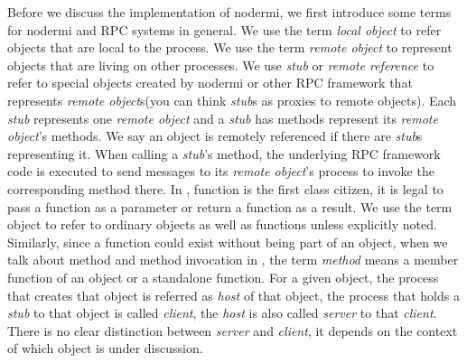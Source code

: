 Before we discuss the implementation of nodermi,
we first introduce some terms for nodermi and 
RPC systems in general.
We use the term \emph{local object}
to refer objects that are local to the process.
We use the term \emph{remote object} to represent objects that are
living on other processes.
We use \emph{stub} or \emph{remote reference} to refer to special objects created
by nodermi or other RPC framework that
represents \emph{remote object}s(you can think \emph{stub}s as proxies to remote objects).
Each \emph{stub} represents one \emph{remote object}
and a \emph{stub} has methods represent
its \emph{remote object}'s methods.
We say an object is remotely referenced if there are \emph{stub}s representing 
it. 
When calling a \emph{stub}'s method, the underlying
RPC framework code is executed to send messages
to its \emph{remote object}'s process
to invoke the corresponding method there.
In \js{}, function is the first class citizen, it is legal
to pass a function as a parameter or return a function as a result.
We use the term object to refer to ordinary objects as well as
functions unless explicitly noted.
Similarly, since a function could exist without being part of an object,
when we talk about method and method invocation in \js, 
the term \emph{method} means a member function of an object
or a standalone function.
For a given object, the process that creates that object is referred
as \emph{host} of that object,
the process that holds a \emph{stub} to that object is called \emph{client},
the \emph{host} is also called \emph{server} to that \emph{client}.
There is no clear distinction between \emph{server} and \emph{client},
it depends on the context of which object is under discussion.



